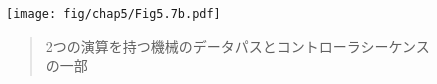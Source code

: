 \begin{figure}[tb]
\label{Figure 5.7}
\centering
\begin{comment}
\heading{Figure 5.7:} Portions of the data paths and controller sequence for a machine with two \acronym{GCD} computations.

\begin{example}
                            ___                                 ___  
+-----+        +-----+     /   \    +-----+        +-----+     /   \ 
|  a  |<-(X)---+  b  |--->|  =  |   |  c  |<-(X)---+  d  |--->|  =  |
+--+--+  a<-b  ++----+     \___/    +--+--+  c<-d  ++----+     \___/ 
   |            |  ^         ^         |            |  ^         ^   
   `----.   .---'  |         |         `----.   .---'  |         |   
        V   V     (X) b<-t   |              V   V     (X) d<-t   |   
       -------     |        / \            -------     |        / \  
       \ rem /     |       /_0_\           \ rem /     |       /_0_\ 
        --+--      |                        --+--      |             
          |        |                          |        |             
         (X) t<-r  |                         (X) s<-r  |             
          |        |                          |        |             
          V        |                          V        |             
       +-----+     |                       +-----+     |             
       |  t  +-----'                       |  s  +-----'             
       +-----+                             +-----+                   
\end{example}

\begin{scheme}
gcd-1
 (test (op =) (reg b) (const 0))
 (branch (label after-gcd-1))
 (assign t (op rem) (reg a) (reg b))
 (assign a (reg b))
 (assign b (reg t))
 (goto (label gcd-1))
after-gcd-1
   ~\( \dots \)~
gcd-2
 (test (op =) (reg d) (const 0))
 (branch (label after-gcd-2))
 (assign s (op rem) (reg c) (reg d))
 (assign c (reg d))
 (assign d (reg s))
 (goto (label gcd-2))
after-gcd-2
\end{scheme}

\end{comment}
\texttt{[image: fig/chap5/Fig5.7b.pdf]}
\begin{quote}
 2つの演算を持つ機械のデータパスとコントローラシーケンスの一部
\end{quote}
\end{figure}


